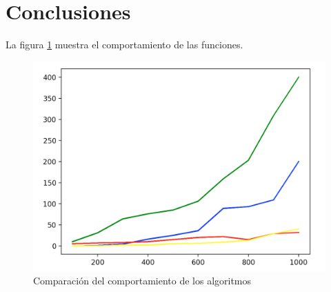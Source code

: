 \documentclass[conference]{IEEEtran}
\begin{document}
\section{Conclusiones}


La figura \ref{fig:grafica} muestra el comportamiento de las funciones.

\begin{figure}
	\centering
	\includegraphics[width=1.0\columnwidth]{Imagenes/grafica1.png}
	\caption{Comparaci\'on del comportamiento de los algoritmos}
	\label{fig:grafica}
\end{figure}
\end{document}
